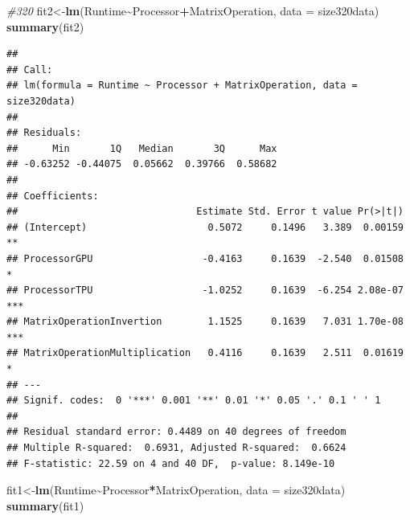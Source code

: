 \documentclass[
]{article}
\newenvironment{Shaded}{\begin{snugshade}}{\end{snugshade}}
\newcommand{\CommentTok}[1]{\textcolor[rgb]{0.56,0.35,0.01}{\textit{#1}}}
\newcommand{\DataTypeTok}[1]{\textcolor[rgb]{0.13,0.29,0.53}{#1}}
\newcommand{\KeywordTok}[1]{\textcolor[rgb]{0.13,0.29,0.53}{\textbf{#1}}}
\newcommand{\NormalTok}[1]{#1}
\newcommand{\OperatorTok}[1]{\textcolor[rgb]{0.81,0.36,0.00}{\textbf{#1}}}
\begin{document}
\begin{Shaded}
\begin{Highlighting}[]
\CommentTok{\#320}
\NormalTok{fit2\textless{}{-}}\KeywordTok{lm}\NormalTok{(Runtime}\OperatorTok{\textasciitilde{}}\NormalTok{Processor}\OperatorTok{+}\NormalTok{MatrixOperation, }\DataTypeTok{data =}\NormalTok{ size320data)}
\KeywordTok{summary}\NormalTok{(fit2)}
\end{Highlighting}
\end{Shaded}

\begin{verbatim}
## 
## Call:
## lm(formula = Runtime ~ Processor + MatrixOperation, data = size320data)
## 
## Residuals:
##      Min       1Q   Median       3Q      Max 
## -0.63252 -0.44075  0.05662  0.39766  0.58682 
## 
## Coefficients:
##                               Estimate Std. Error t value Pr(>|t|)    
## (Intercept)                     0.5072     0.1496   3.389  0.00159 ** 
## ProcessorGPU                   -0.4163     0.1639  -2.540  0.01508 *  
## ProcessorTPU                   -1.0252     0.1639  -6.254 2.08e-07 ***
## MatrixOperationInvertion        1.1525     0.1639   7.031 1.70e-08 ***
## MatrixOperationMultiplication   0.4116     0.1639   2.511  0.01619 *  
## ---
## Signif. codes:  0 '***' 0.001 '**' 0.01 '*' 0.05 '.' 0.1 ' ' 1
## 
## Residual standard error: 0.4489 on 40 degrees of freedom
## Multiple R-squared:  0.6931, Adjusted R-squared:  0.6624 
## F-statistic: 22.59 on 4 and 40 DF,  p-value: 8.149e-10
\end{verbatim}

\begin{Shaded}
\begin{Highlighting}[]
\NormalTok{fit1\textless{}{-}}\KeywordTok{lm}\NormalTok{(Runtime}\OperatorTok{\textasciitilde{}}\NormalTok{Processor}\OperatorTok{*}\NormalTok{MatrixOperation, }\DataTypeTok{data =}\NormalTok{ size320data)}
\KeywordTok{summary}\NormalTok{(fit1)}
\end{Highlighting}
\end{Shaded}
\end{document}
